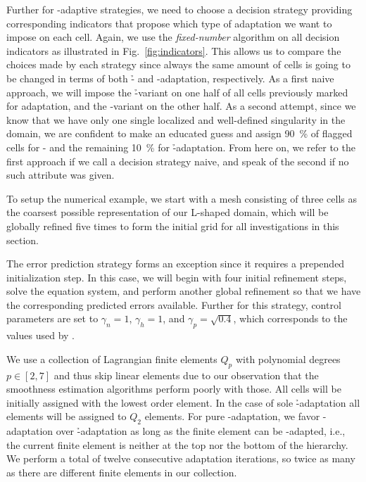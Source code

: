 
Further for \hp-adaptive strategies, we need to choose a decision strategy providing corresponding indicators that propose which type of adaptation we want to impose on each cell.
%
Again, we use the \textit{fixed-number} algorithm on all decision indicators as illustrated in Fig.~\ref{fig:indicators}. This allows us to compare the choices made by each strategy since always the same amount of cells is going to be changed in terms of both \h- and \p-adaptation, respectively.
%
As a first naive approach, we will impose the \h-variant on one half of all cells previously marked for adaptation, and the \p-variant on the other half.
As a second attempt, since we know that we have only one single localized and well-defined singularity in the domain, we are confident to make an educated guess and assign \SI{90}{\percent} of flagged cells for \p- and the remaining \SI{10}{\percent} for \h-adaptation. From here on, we refer to the first approach if we call a decision strategy naive, and speak of the second if no such attribute was given.

To setup the numerical example, we start with a mesh consisting of three cells as the coarsest possible representation of our L-shaped domain, which will be globally refined five times to form the initial grid for all investigations in this section.

The error prediction strategy forms an exception since it requires a prepended initialization step. In this case, we will begin with four initial refinement steps, solve the equation system, and perform another global refinement so that we have the corresponding predicted errors available. Further for this strategy, control parameters are set to $\gamma_n = 1$, $\gamma_h = 1$, and $\gamma_p = \sqrt{0.4}$, which corresponds to the values used by \textcites{melenk2001}{mitchell2014}.

We use a collection of Lagrangian finite elements $Q_p$ with polynomial degrees $p \in [2,7]$ and thus skip linear elements due to our observation that the smoothness estimation algorithms perform poorly with those. All cells will be initially assigned with the lowest order element. In the case of sole \h-adaptation all elements will be assigned to $Q_2$ elements. For pure \p-adaptation, we favor \p-adaptation over \h-adaptation as long as the finite element can be \p-adapted, i.e., the current finite element is neither at the top nor the bottom of the hierarchy. We perform a total of twelve consecutive adaptation iterations, so twice as many as there are different finite elements in our collection.


